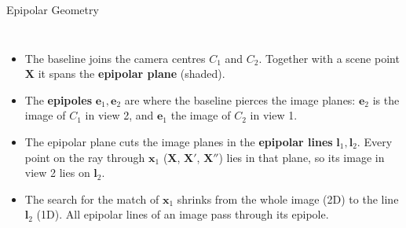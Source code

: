 \begin{frame}{Epipolar Geometry}
\begin{columns}[T,onlytextwidth]
      \begin{itemize}\footnotesize\itemsep0.35em
        \item The baseline joins the camera centres $C_1$ and $C_2$. Together with a scene point $\mathbf{X}$ it spans the \textbf{epipolar plane} (shaded).
        \item The \textbf{epipoles} $\mathbf{e}_1,\mathbf{e}_2$ are where the baseline pierces the image planes: $\mathbf{e}_2$ is the image of $C_1$ in view 2, and $\mathbf{e}_1$ the image of $C_2$ in view 1.
        \item The epipolar plane cuts the image planes in the \textbf{epipolar lines} $\mathbf{l}_1,\mathbf{l}_2$. Every point on the ray through $\mathbf{x}_1$ ($\mathbf{X}$, $\mathbf{X}'$, $\mathbf{X}''$) lies in that plane, so its image in view 2 lies on $\mathbf{l}_2$.
        \item The search for the match of $\mathbf{x}_1$ shrinks from the whole image (2D) to the line $\mathbf{l}_2$ (1D). All epipolar lines of an image pass through its epipole.
      \end{itemize}
  \end{columns}
\end{frame}

